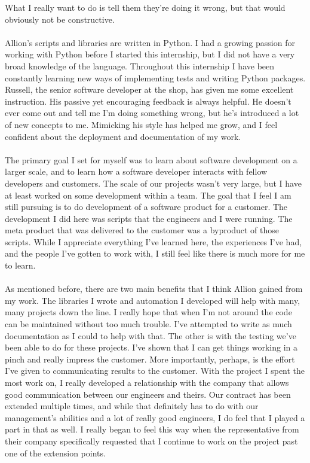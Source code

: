\documentclass{article}
\begin{document}
What I really want to do is tell them they're doing it wrong, but that would
obviously not be constructive.\\
\\
Allion's scripts and libraries are written in Python. I had a growing passion
for working with Python before I started this internship, but I did not have a
very broad knowledge of the language. Throughout this internship I have been
constantly learning new ways of implementing tests and writing Python packages.
Russell, the senior software developer at the shop, has given me some excellent
instruction. His passive yet encouraging feedback is always helpful. He doesn't
ever come out and tell me I'm doing something wrong, but he's introduced a lot
of new concepts to me. Mimicking his style has helped me grow, and I feel
confident about the deployment and documentation of my work.\\
\\
The primary goal I set for myself was to learn about software development on a
larger scale, and to learn how a software developer interacts with fellow
developers and customers. The scale of our projects wasn't very large, but I
have at least worked on some development within a team. The goal that I feel I
am still pursuing is to do development of a software product for a customer. The
development I did here was scripts that the engineers and I were running. The
meta product that was delivered to the customer was a byproduct of those
scripts. While I appreciate everything I've learned here, the experiences I've
had, and the people I've gotten to work with, I still feel like there is much
more for me to learn.\\
\\
As mentioned before, there are two main benefits that I think Allion gained
from my work. The libraries I wrote and automation I developed will help with
many, many projects down the line. I really hope that when I'm not around the
code can be maintained without too much trouble. I've attempted to write as much
documentation as I could to help with that. The other is with the testing we've
been able to do for these projects. I've shown that I can get things working in
a pinch and really impress the customer. More importantly, perhaps, is the
effort I've given to communicating results to the customer. With the project I
spent the most work on, I really developed a relationship with the company that
allows good communication between our engineers and theirs. Our contract has
been extended multiple times, and while that definitely has to do with our
management's abilities and a lot of really good engineers, I do feel that I
played a part in that as well. I really began to feel this way when the
representative from their company specifically requested that I continue to
work on the project past one of the extension points.
\end{document}
